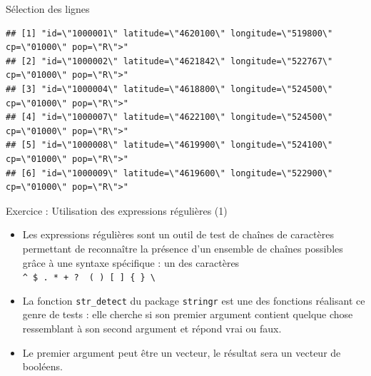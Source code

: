 \documentclass[
  ignorenonframetext,
]{beamer}
\providecommand{\tightlist}{%
  \setlength{\itemsep}{0pt}\setlength{\parskip}{0pt}}
\begin{document}
\begin{frame}[fragile]{Sélection des lignes}
\begin{verbatim}
## [1] "id=\"1000001\" latitude=\"4620100\" longitude=\"519800\" cp=\"01000\" pop=\"R\">"
## [2] "id=\"1000002\" latitude=\"4621842\" longitude=\"522767\" cp=\"01000\" pop=\"R\">"
## [3] "id=\"1000004\" latitude=\"4618800\" longitude=\"524500\" cp=\"01000\" pop=\"R\">"
## [4] "id=\"1000007\" latitude=\"4622100\" longitude=\"524500\" cp=\"01000\" pop=\"R\">"
## [5] "id=\"1000008\" latitude=\"4619900\" longitude=\"524100\" cp=\"01000\" pop=\"R\">"
## [6] "id=\"1000009\" latitude=\"4619600\" longitude=\"522900\" cp=\"01000\" pop=\"R\">"
\end{verbatim}

\normalsize
\end{frame}

\begin{frame}[fragile]{Exercice : Utilisation des expressions régulières
(1)}
\protect\hypertarget{exercice-utilisation-des-expressions-ruxe9guliuxe8res-1}{}
\begin{itemize}
\tightlist
\item
  Les expressions régulières sont un outil de test de chaînes de
  caractères permettant de reconnaître la présence d'un ensemble de
  chaînes possibles grâce à une syntaxe spécifique : un des caractères
  \texttt{\^{}\ \$\ .\ *\ +\ ?\ \textbar{}\ (\ )\ {[}\ {]}\ \{\ \}\ \textbackslash{}}
\item
  La fonction \texttt{str\_detect} du package \texttt{stringr} est une
  des fonctions réalisant ce genre de tests : elle cherche si son
  premier argument contient quelque chose ressemblant à son second
  argument et répond vrai ou faux.
\item
  Le premier argument peut être un vecteur, le résultat sera un vecteur
  de booléens.
\end{itemize}
\end{frame}
\end{document}
